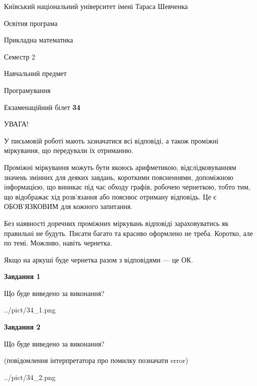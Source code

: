 \documentclass[12pt, ukrainian]{article}
\begin{document}
{{\begin {small}\par
{ \center  Київський національний університет імені Тараса Шевченка \par}
{\parbox {5 cm}{Освітня програма \hfill}{\parbox {7 cm}{Прикладна математика\hfill}}\parbox {6 cm}{\hfill Семестр 2}}\par
{\parbox {5 cm} {Навчальний предмет \hfill}\parbox {7 cm}{Програмування \hfill}\parbox {6cm}{\hfill}\par}\vspace{-7pt} \end{small}}{\center Екзаменаційний білет \No \textbf
{ 34 }\par}}
{
\begin {large}
УВАГА!

У письмовій роботі мають зазначатися всі відповіді, а також проміжні міркування, що передували їх отриманню.

Проміжні міркування можуть бути якоюсь арифметикою, відслідковуванням зна\-чень змінних для деяких завдань,
короткими поясненнями, допоміжною інформацією, що виникає під час обходу графів, робочею чернеткою,
тобто тим, що відображає хід розв’язання або пояснює отриману відповідь.
Це є ОБОВ’ЯЗКОВИМ для кожного запитання.

Без наявності доречних проміжних міркувань відповіді зараховуватись як правиль\-ні не будуть.
Писати багато та красиво оформлено не треба. Коротко, але по темі. Можли\-во, навіть чернетка.

Якщо на аркуші буде чернетка разом з відповідями --- це ОК.

\newpage

{\begin {center}\textbf{Завдання 1}\end {center}}\par
Що буде виведено за виконання?\par
\begin{center}
	{../pict/34_1.png}
\end{center}
\newpage

{\begin {center}\textbf{Завдання 2}\end {center}}\par
Що буде виведено за виконання?\par
 (повідомлення інтерпретатора про помилку позначати error)\par
\begin{center}
	{../pict/34_2.png}
\end{center}
\newpage


\end{large}}
\end{document}

